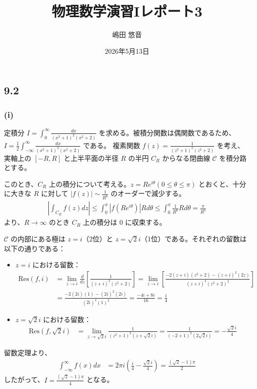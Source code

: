 \documentclass[platex,dvipdfmx,a4paper]{jsarticle}
\title{物理数学演習Iレポート3}
\author{嶋田 悠音}
\date{2026年5月13日}
\begin{document}
  \maketitle
  \subsection*{9.2}

  \subsubsection*{(i)}
  定積分 $I = \int_{0}^{\infty} \frac{dx}{(x^2+1)^2(x^2+2)}$ を求める。被積分関数は偶関数であるため、$I = \frac{1}{2} \int_{-\infty}^{\infty} \frac{dx}{(x^2+1)^2(x^2+2)}$ である。
  複素関数 $f(z) = \frac{1}{(z^2+1)^2(z^2+2)}$ を考え、実軸上の $[-R, R]$ と上半平面の半径 $R$ の半円 $C_R$ からなる閉曲線 $\mathcal{C}$ を積分路とする。

  このとき、$C_R$ 上の積分について考える。$z = R e^{i\theta} (0 \le \theta \le \pi)$ とおくと、十分に大きな $R$ に対して $|f(z)| \sim \frac{1}{R^6}$ のオーダーで減少する。
  \begin{align*}
  \left| \int_{C_R} f(z) dz \right| \le \int_{0}^{\pi} \left| f(Re^{i\theta}) \right| R d\theta \le \int_{0}^{\pi} \frac{1}{R^6} R d\theta = \frac{\pi}{R^5}
  \end{align*}
  より、$R \to \infty$ のとき $C_R$ 上の積分は $0$ に収束する。

  $\mathcal{C}$ の内部にある極は $z=i$（2位）と $z=\sqrt{2}i$（1位）である。それぞれの留数は以下の通りである：
  \begin{itemize}
      \item $z=i$ における留数：
      \begin{align*}
      \text{Res}(f, i) &= \lim_{z \to i} \frac{d}{dz} \left[ \frac{1}{(z+i)^2(z^2+2)} \right] = \lim_{z \to i} \left[ \frac{-2(z+i)(z^2+2) - (z+i)^2(2z)}{(z+i)^4(z^2+2)^2} \right] \\
      &= \frac{-2(2i)(1) - (2i)^2(2i)}{(2i)^4(1)^2} = \frac{-4i + 8i}{16} = \frac{i}{4}
      \end{align*}
      \item $z=\sqrt{2}i$ における留数：
      \begin{align*}
      \text{Res}(f, \sqrt{2}i) &= \lim_{z \to \sqrt{2}i} \frac{1}{(z^2+1)^2(z+\sqrt{2}i)} = \frac{1}{(-2+1)^2(2\sqrt{2}i)} = -\frac{\sqrt{2}i}{4}
      \end{align*}
  \end{itemize}
  留数定理より、
  \begin{align*}
  \int_{-\infty}^{\infty} f(x) dx &= 2\pi i \left( \frac{i}{4} - \frac{\sqrt{2}i}{4} \right) = \frac{(\sqrt{2}-1)\pi}{2}
  \end{align*}
  したがって、$I = \frac{(\sqrt{2}-1)\pi}{4}$ となる。
\end{document}
